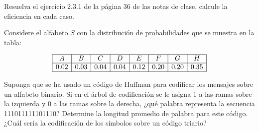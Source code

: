 
Resuelva el ejercicio 2.3.1 de la página 36 de las notas de clase, calcule la eficiencia en cada caso.

Considere el alfabeto $S$ con la distribución de probabilidades que se muestra en la tabla:

\[
\begin{array}{|c|c|c|c|c|c|c|c|}
\hline
A & B & C & D & E & F & G & H \\
\hline
0.02 & 0.03 & 0.04 & 0.04 & 0.12 & 0.20 & 0.20 & 0.35 \\
\hline
\end{array}
\]

Suponga que se ha usado un código de Huffman para codificar los mensajes sobre un alfabeto binario. Si en el árbol de codificación se le asigna 1 a las ramas sobre la izquierda y 0 a las ramas sobre la derecha, ¿qué palabra representa la secuencia 111011111101110? Determine la longitud promedio de palabra para este código. ¿Cuál sería la codificación de los símbolos sobre un código triario?


